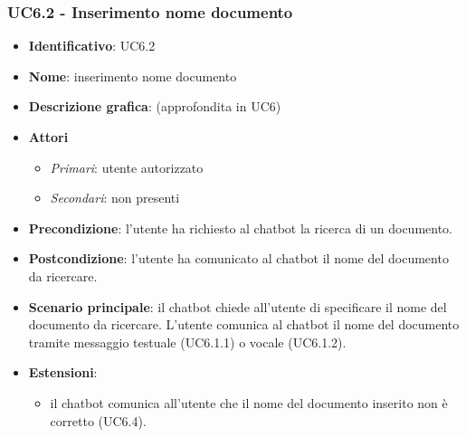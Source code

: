 \subsubsection{UC6.2 - Inserimento nome documento}
\begin{itemize}
    \item \textbf{Identificativo}: UC6.2
    \item \textbf{Nome}: inserimento nome documento
    \item \textbf{Descrizione grafica}: (approfondita in UC6)
    \item \textbf{Attori}
 \begin{itemize} 
    \item \textit{Primari}: utente autorizzato
    \item \textit{Secondari}: non presenti
 \end{itemize}
 \item \textbf{Precondizione}: l'utente ha richiesto al chatbot la ricerca di un documento.
 \item \textbf{Postcondizione}:  l'utente ha comunicato al chatbot il nome del documento da ricercare.
 \item \textbf{Scenario principale}: il chatbot chiede all'utente di specificare il nome del documento da ricercare. L'utente comunica al chatbot il nome del documento tramite messaggio testuale (UC6.1.1) o vocale (UC6.1.2).
 \item \textbf{Estensioni}: 
\begin{itemize} 
    \item il chatbot comunica all'utente che il nome del documento inserito non è corretto (UC6.4).
 \end{itemize}
\end{itemize}

